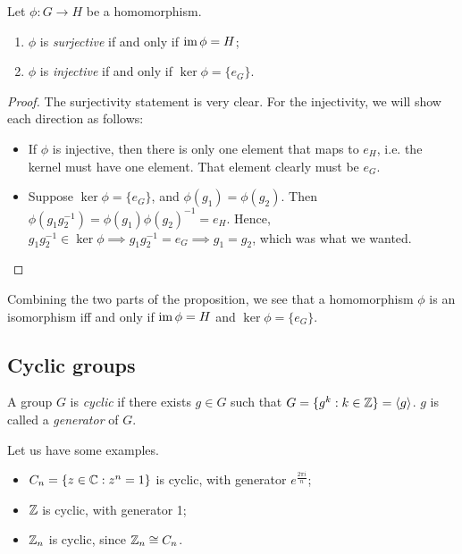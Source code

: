 \documentclass{../template/note}
\begin{document}
    \begin{proposition}
        \label{surj-inv-crits}
        Let \(\phi: G \to H\) be a homomorphism.
        \begin{enumerate}
            \item \(\phi\) is \emph{surjective} if and only if \(\operatorname{im} \phi = H\);
            \item \(\phi\) is \emph{injective} if and only if \(\ker \phi = \{e_G\}\).
        \end{enumerate}
    \end{proposition}
    

    \begin{proof}
        The surjectivity statement is very clear. For the injectivity, we will show each direction as follows:
        \begin{itemize}
            \item[\(\implies\)] If \(\phi\) is injective, then there is only one element that maps to \(e_H\), i.e. the kernel must have one element. That element clearly must be \(e_G\).
            \item[\(\impliedby\)] Suppose \(\ker \phi = \{e_G\}\), and \(\phi(g_1) = \phi(g_2)\). Then \(\phi(g_1g_2^{-1}) = \phi(g_1)\phi(g_2)^{-1} = e_H\). Hence, \(g_1g_2^{-1} \in \ker \phi \implies g_1g_2^{-1} = e_G \implies g_1 = g_2\), which was what we wanted.
        \end{itemize}
    \end{proof}
    
    Combining the two parts of the proposition, we see that a homomorphism \(\phi\) is an isomorphism iff and only if \(\operatorname{im} \phi = H\) and \(\ker \phi = \{e_G\}\).

    \subsection{Cyclic groups}

    \begin{definition}
        A group \(G\) is \emph{cyclic} if there exists \(g \in G\) such that \(G = \{g^k: k \in \mathbb Z\} = \left \langle g \right \rangle\). \(g\) is called a \emph{generator} of \(G\).
    \end{definition}
    
    \begin{example*}
        Let us have some examples.
        \begin{itemize}
            \item \(C_n = \{z \in \mathbb C: z^n = 1\}\) is cyclic, with generator \(e^{\frac{2\pi i}n}\);
            \item \(\mathbb Z\) is cyclic, with generator 1;
            \item \(\mathbb Z_n\) is cyclic, since \(\mathbb Z_n \cong C_n\).
        \end{itemize}
    \end{example*}
    
\end{document}
